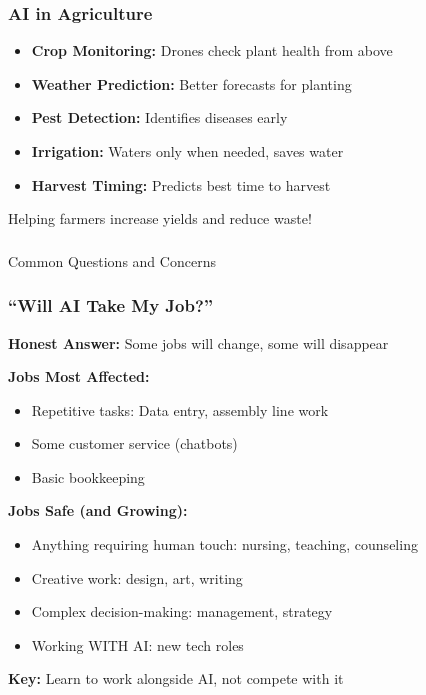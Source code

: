 \begin{frame}[fragile]\frametitle{AI in Agriculture}

\begin{itemize}
\item {\bf Crop Monitoring:} Drones check plant health from above
\item {\bf Weather Prediction:} Better forecasts for planting
\item {\bf Pest Detection:} Identifies diseases early
\item {\bf Irrigation:} Waters only when needed, saves water
\item {\bf Harvest Timing:} Predicts best time to harvest
\end{itemize}

Helping farmers increase yields and reduce waste!
\end{frame}

\begin{frame}[fragile]\frametitle{}
\begin{center}
{\Large Common Questions and Concerns}
\end{center}
\end{frame}

\begin{frame}[fragile]\frametitle{``Will AI Take My Job?''}

{\bf Honest Answer:} Some jobs will change, some will disappear

{\bf Jobs Most Affected:}
\begin{itemize}
\item Repetitive tasks: Data entry, assembly line work
\item Some customer service (chatbots)
\item Basic bookkeeping
\end{itemize}

{\bf Jobs Safe (and Growing):}
\begin{itemize}
\item Anything requiring human touch: nursing, teaching, counseling
\item Creative work: design, art, writing
\item Complex decision-making: management, strategy
\item Working WITH AI: new tech roles
\end{itemize}

{\bf Key:} Learn to work alongside AI, not compete with it
\end{frame}

